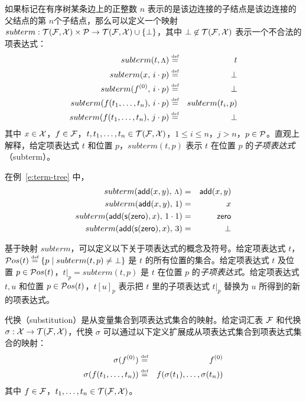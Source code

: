 如果标记在有序树某条边上的正整数 $n$ 表示的是该边连接的子结点是该边连接的父结点的第 $n$个子结点，那么可以定义一个映射 $subterm : \mathcal{T}(\mathcal{F},\mathcal{X}) \times \mathcal{P} \rightarrow \mathcal{T}(\mathcal{F},\mathcal{X})\cup\{\bot\}$，其中 $\bot\not\in\mathcal{T}(\mathcal{F},\mathcal{X})$ 表示一个不合法的项表达式：
\begin{eqnarray}
  subterm(t, \mbox {\footnotesize $\Lambda$}) & \stackrel{\text{\tiny def}}{=} & t  \nonumber \\
  subterm(x,\, i\cdot p) & \stackrel{\text{\tiny def}}{=} & \bot  \nonumber \\
  subterm(f^{(0)},\, i\cdot p) & \stackrel{\text{\tiny def}}{=} & \bot  \nonumber \\
  subterm(f(t_1,\ldots,t_n),\, i\cdot p) & \stackrel{\text{\tiny def}}{=} & subterm(t_i, p) \nonumber \\
  subterm(f(t_1,\ldots,t_n),\, j\cdot p) & \stackrel{\text{\tiny def}}{=} & \bot \nonumber
\end{eqnarray}
其中 $x\in\mathcal{X}$，$f\in\mathcal{F}$，$t,t_1,\ldots,t_n\in\mathcal{T}(\mathcal{F},\mathcal{X})$，$1\le i\le n$，$j > n$，$p\in\mathcal{P}$。直观上解释，给定项表达式 $t$ 和位置 $p$，$subterm(t,p)$ 表示 $t$ 在位置 $p$ 的\emph{子项表达式}（subterm）。

\begin{example}
在例~\ref{e:term-tree} 中，
\begin{eqnarray}
  subterm(\operatorname{\mathsf{add}}(x,y),\, \mbox {\footnotesize $\Lambda$}) & = & \operatorname{\mathsf{add}}(x,y)  \nonumber \\
  subterm(\operatorname{\mathsf{add}}(x,y),\, 1) & = & x \nonumber \\
  subterm(\operatorname{\mathsf{add}}(\operatorname{\mathsf{s}}(\operatorname{\mathsf{zero}}),x),\, 1\cdot 1) & = & \operatorname{\mathsf{zero}}  \nonumber \\
  subterm(\operatorname{\mathsf{add}}(\operatorname{\mathsf{s}}(\operatorname{\mathsf{zero}}),x),\, 3) & = & \bot  \nonumber
\end{eqnarray}
\end{example}

基于映射 $subterm$，可以定义以下关于项表达式的概念及符号。给定项表达式 $t$，$\mathcal{P}os({t})\stackrel{\text{\tiny def}}{=} \{p\mid subterm(t,p)\not=\bot\}$ 是 $t$ 的所有位置的集合。给定项表达式 $t$ 及位置 $p \in \mathcal{P}os({t})$，$t|_p = subterm(t,p)$ 是 $t$ 在位置 $p$ 的\emph{子项表达式}。给定项表达式 $t,u$ 和位置 $p\in\mathcal{P}os({t})$，$t[u]_p$ 表示把 $t$ 里的子项表达式 $t|_p$ 替换为 $u$ 所得到的新的项表达式。

\begin{definition}[代换]
代换（substitution）是从变量集合到项表达式集合的映射。给定词汇表 $\mathcal{F}$ 和代换 $\sigma : \mathcal{X} \rightarrow \mathcal{T}(\mathcal{F},\mathcal{X})$，代换 $\sigma$ 可以通过以下定义扩展成从项表达式集合到项表达式集合的映射：
\begin{eqnarray}
  \sigma(f^{(0)}) & \stackrel{\text{\tiny def}}{=} & f^{(0)}  \nonumber \\
  \sigma(f(t_1,\ldots,t_n)) & \stackrel{\text{\tiny def}}{=} & f(\sigma(t_1),\ldots,\sigma(t_n)) \nonumber
\end{eqnarray}
其中 $f\in\mathcal{F}$，$t_1,\ldots,t_n\in\mathcal{T}(\mathcal{F},\mathcal{X})$。
\end{definition}

